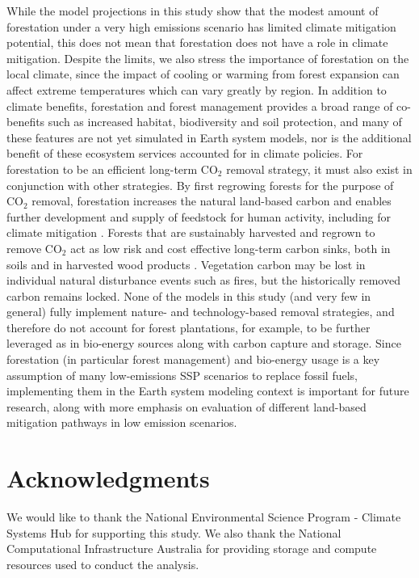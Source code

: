 \documentclass[]{article}
\begin{document}
While the model projections in this study show that the modest amount of forestation under a very high emissions scenario has limited climate mitigation potential, this does not mean that forestation does not have a role in climate mitigation.
Despite the limits, we also stress the importance of forestation on the local climate, since the impact of cooling or warming from forest expansion can affect extreme temperatures which can vary greatly by region.
In addition to climate benefits, forestation and forest management provides a broad range of co-benefits such as increased habitat, biodiversity and soil protection, and many of these features are not yet simulated in Earth system models, nor is the additional benefit of these ecosystem services accounted for in climate policies.
For forestation to be an efficient long-term CO$_2$ removal strategy, it must also exist in conjunction with other strategies.
By first regrowing forests for the purpose of CO$_2$ removal, forestation increases the natural land-based carbon and enables further development and supply of feedstock for human activity, including for climate mitigation \parencite{geng_review_2017}.
Forests that are sustainably harvested and regrown to remove CO$_2$ act as low risk and cost effective long-term carbon sinks, both in soils and in harvested wood products \parencite{schulze_climate_2020,soimakallio_trade-offs_2021}.
Vegetation carbon may be lost in individual natural disturbance events such as fires, but the historically removed carbon remains locked.
None of the models in this study (and very few in general) fully implement nature- and technology-based removal strategies, and therefore do not account for forest plantations, for example, to be further leveraged as in bio-energy sources along with carbon capture and storage.
Since forestation (in particular forest management) and bio-energy usage is a key assumption of many low-emissions SSP scenarios to replace fossil fuels, implementing them in the Earth system modeling context is important for future research, along with more emphasis on evaluation of different land-based mitigation pathways in low emission scenarios.

\section{Acknowledgments}
We would like to thank the National Environmental Science Program - Climate Systems Hub for supporting this study.
We also thank the National Computational Infrastructure Australia for providing storage and compute resources used to conduct the analysis.
\end{document}
